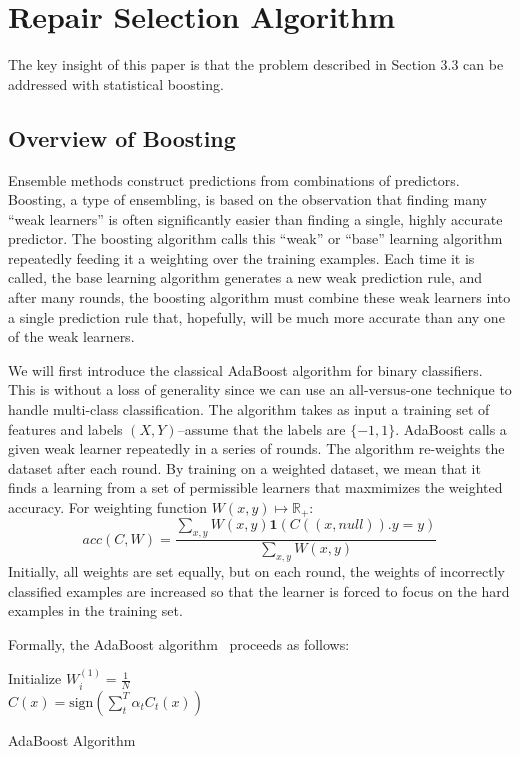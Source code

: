 \section{Repair Selection Algorithm}
The key insight of this paper is that the problem described in Section 3.3 can be addressed with statistical boosting.

\subsection{Overview of Boosting}
Ensemble methods construct predictions from combinations of predictors.
Boosting, a type of ensembling, is based on the observation that finding many ``weak learners'' is often significantly easier than finding a single, highly accurate predictor. 
The boosting algorithm calls this ``weak'' or ``base'' learning algorithm repeatedly feeding it a  weighting over the training examples.
Each time it is called, the base learning algorithm generates a new weak prediction rule, and after many rounds, the boosting algorithm must combine these weak learners into a single prediction rule that, hopefully, will be much more accurate than any one of the weak learners.

We will first introduce the classical AdaBoost algorithm for binary classifiers.
This is without a loss of generality since we can use an all-versus-one technique to handle multi-class classification.
The algorithm takes as input a training set of features and labels $(X,Y)$--assume that the labels are $\{-1, 1\}$.
AdaBoost calls a given weak learner repeatedly in a series of rounds. 
The algorithm re-weights the dataset after each round.
By training on a weighted dataset, we mean that it finds a learning from a set of permissible learners that maxmimizes the weighted accuracy.
For weighting function $W(x,y) \mapsto \mathbb{R}_+$:
\[
acc(C, W) = \frac{\sum_{x,y} W(x,y) \mathbf{1}(C((x, null)).y = y)}{\sum_{x,y} W(x,y) }
\]
Initially, all weights are set equally, but on each round, the weights of incorrectly classified examples are increased so that the learner is forced to focus on the hard examples in the training set.

Formally, the AdaBoost algorithm~\cite{freund1995desicion} proceeds as follows:
\begin{algorithm}
Initialize $W^{(1)}_i = \frac{1}{N}$\\
\Return $C(x) = \text{sign}(\sum_t^T \alpha_t C_t(x) )$
\caption{AdaBoost Algorithm}
\label{alg:adaboost}
\end{algorithm}

